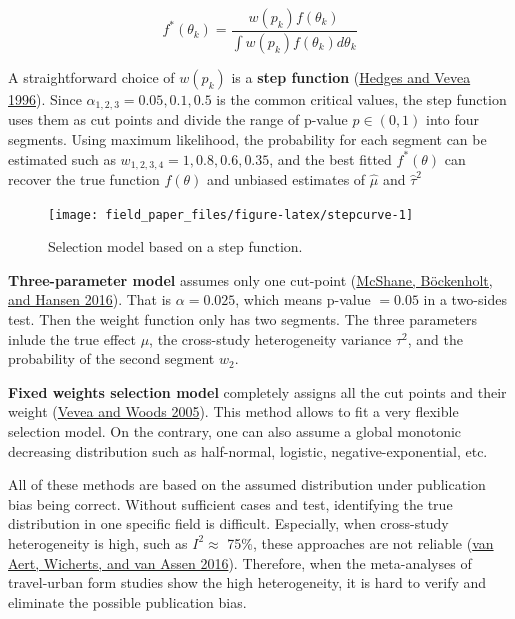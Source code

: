 \documentclass[
  11pt,
  openany]{memoir}
\begin{document}
\begin{equation}
f^*(\theta_k) = \frac{w(p_k)f(\theta_k)}{\int w(p_k) f(\theta_k) d\theta_k}
\end{equation}

A straightforward choice of \(w(p_k)\) is a \textbf{step function} (\protect\hyperlink{ref-hedgesEstimatingEffectSize1996}{Hedges and Vevea 1996}).
Since \(\alpha_{1,2,3}=0.05, 0.1, 0.5\) is the common critical values, the step function uses them as cut points and divide the range of p-value \(p\in(0,1)\) into four segments.
Using maximum likelihood, the probability for each segment can be estimated such as \(w_{1,2,3,4}=1,0.8,0.6,0.35\), and the best fitted \(f^*(\theta)\) can recover the true function \(f(\theta)\) and unbiased estimates of \(\hat\mu\) and \(\hat\tau^2\)

\begin{figure}

{\centering \texttt{[image: field\_paper\_files/figure-latex/stepcurve-1]} 

}

\caption{Selection model based on a step function.}\label{fig:stepcurve}
\end{figure}

\textbf{Three-parameter model} assumes only one cut-point (\protect\hyperlink{ref-mcshaneAdjustingPublicationBias2016}{McShane, Böckenholt, and Hansen 2016}).
That is \(\alpha=0.025\), which means p-value \(=0.05\) in a two-sides test. Then the weight function only has two segments. The three parameters inlude the true effect \(\mu\), the cross-study heterogeneity variance \(\tau^2\), and the probability of the second segment \(w_2\).

\textbf{Fixed weights selection model} completely assigns all the cut points and their weight (\protect\hyperlink{ref-veveaPublicationBiasResearch2005}{Vevea and Woods 2005}).
This method allows to fit a very flexible selection model.
On the contrary, one can also assume a global monotonic decreasing distribution such as half-normal, logistic, negative-exponential, etc.

All of these methods are based on the assumed distribution under publication bias being correct.
Without sufficient cases and test, identifying the true distribution in one specific field is difficult.
Especially, when cross-study heterogeneity is high, such as \(I^2\approx\) 75\%, these approaches are not reliable (\protect\hyperlink{ref-vanaertConductingMetaAnalysesBased2016}{van Aert, Wicherts, and van Assen 2016}).
Therefore, when the meta-analyses of travel-urban form studies show the high heterogeneity, it is hard to verify and eliminate the possible publication bias.
\end{document}
